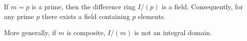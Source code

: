 If $m = p$ is a prime, then the difference ring $I/(p)$ is a field. Consequently, for any prime $p$ there exists a field containing $p$ elements.

More generally, if $m$ is composite, $I/(m)$ is not an integral domain.
